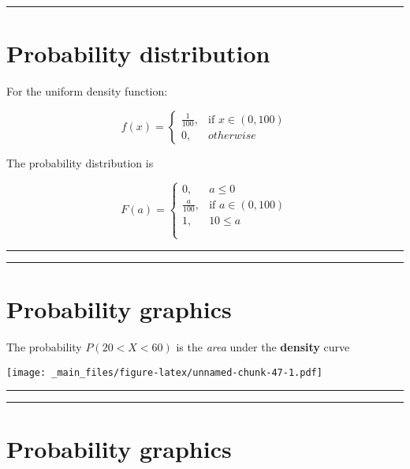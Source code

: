 \documentclass[
]{book}
\begin{document}
\begin{center}\rule{0.5\linewidth}{0.5pt}\end{center}

\hypertarget{probability-distribution-5}{%
\section{Probability distribution}\label{probability-distribution-5}}

For the uniform density function:

\[
    f(x)= 
\begin{cases}
    \frac{1}{100},& \text{if } x\in (0,100)\\
    0,& otherwise 
\end{cases}
\]

The probability distribution is

\[
    F(a)= 
\begin{cases}
    0,& a \leq 0 \\
    \frac{a}{100},& \text{if } a\in (0,100)\\
    1, & 10 \leq a \\
    \\
\end{cases}
\]

\begin{center}\rule{0.5\linewidth}{0.5pt}\end{center}

\begin{center}\rule{0.5\linewidth}{0.5pt}\end{center}

\hypertarget{probability-graphics}{%
\section{Probability graphics}\label{probability-graphics}}

The probability \(P(20<X<60)\) is the \emph{area} under the \textbf{density} curve

\texttt{[image: \_main\_files/figure-latex/unnamed-chunk-47-1.pdf]}

\begin{center}\rule{0.5\linewidth}{0.5pt}\end{center}

\begin{center}\rule{0.5\linewidth}{0.5pt}\end{center}

\hypertarget{probability-graphics-1}{%
\section{Probability graphics}\label{probability-graphics-1}}
\end{document}
